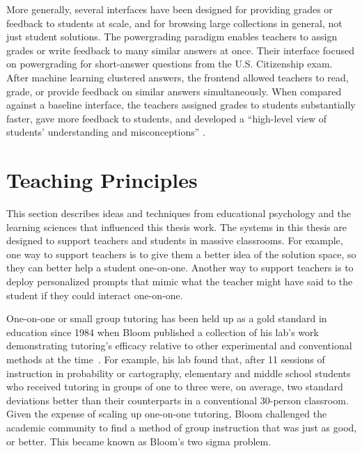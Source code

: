 More generally, several interfaces have been designed for providing grades or feedback to students at scale, and for browsing large collections in general, not just student solutions. The powergrading paradigm \cite{basupowergrading} enables teachers to assign grades or write feedback to many similar answers at once. Their interface focused on powergrading for short-answer questions from the U.S. Citizenship exam. After machine learning clustered answers, the frontend allowed teachers to read, grade, or provide feedback on similar answers simultaneously. When compared against a baseline interface, the teachers assigned grades to students substantially faster, gave more feedback to students, and developed a ``high-level view of students' understanding and misconceptions'' \cite{basuDivideAndConquer}.

\section{Teaching Principles}


This section describes ideas and techniques from educational psychology and the learning sciences that influenced this thesis work. The systems in this thesis are designed to support teachers and students in massive classrooms. For example, one way to support teachers is to give them a better idea of the solution space, so they can better help a student one-on-one. Another way to support teachers is to deploy personalized prompts that mimic what the teacher might have said to the student if they could interact one-on-one.

One-on-one or small group tutoring has been held up as a gold standard in education since 1984 when Bloom published a collection of his lab's work demonstrating tutoring's efficacy relative to other experimental and conventional methods at the time~\cite{bloom}. For example, his lab found that, after 11 sessions of instruction in probability or cartography, elementary and middle school students who received tutoring in groups of one to three were, on average, two standard deviations better than their counterparts in a conventional 30-person classroom. Given the expense of scaling up one-on-one tutoring, Bloom challenged the academic community to find a method of group instruction that was just as good, or better. This became known as Bloom's two sigma problem.

